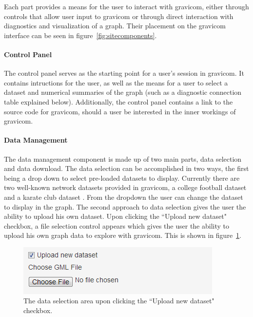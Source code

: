 \documentclass{article}\usepackage[]{graphicx}\usepackage[]{color}
\begin{document}
Each part provides a means for the user to interact with gravicom, either through controls that allow user input to gravicom or through direct interaction with diagnostics and visualization of a graph. Their placement on the gravicom interface can be seen in figure~\ref{fig:sitecomponents}.

\paragraph{Control Panel}
The control panel serves as the starting point for a user's session in gravicom. It contains intructions for the user, as well as the means for a user to select a dataset and numerical summaries of the graph (such as a diagnostic connection table explained below). Additionally, the control panel contains a link to the source code for gravicom, should a user be interested in the inner workings of gravicom.

\paragraph{Data Management}
The data management component is made up of two main parts, data selection and data download. The data selection can be accomplished in two ways, the first being a drop down to select pre-loaded datasets to display. Currently there are two well-known network datasets provided in gravicom, a college football dataset \cite{gn-football} and a karate club dataset \cite{zachary1977information}. From the dropdown the user can change the dataset to display in the graph. The second approach to data selection gives the user the ability to upload his own dataset. Upon clicking the ``Upload new dataset" checkbox, a file selection control appears which gives the user the ability to upload his own graph data to explore with gravicom. This is shown in figure~\ref{fig:uploadnewdataset}. 

\begin{figure}[H]
\centering
\includegraphics[]{images/uploadnewdataset.png}
\caption{\label{fig:uploadnewdataset} The data selection area upon clicking the ``Upload new dataset" checkbox.}
\end{figure}
\end{document}
